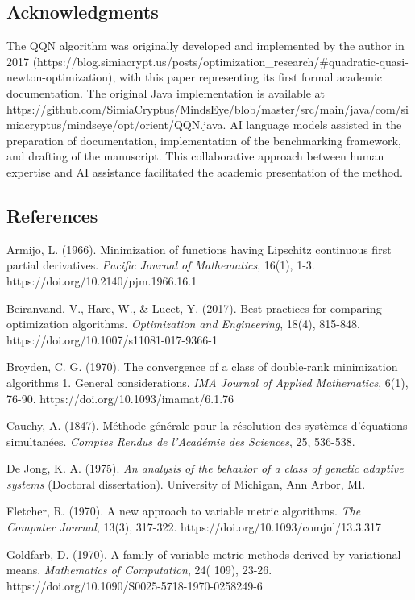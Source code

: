 \hypertarget{acknowledgments}{%
\subsection{Acknowledgments}\label{acknowledgments}}

The QQN algorithm was originally developed and implemented by the author in 2017 (https://blog.simiacrypt.us/posts/optimization\_research/\#quadratic-quasi-newton-optimization), with this paper representing its first formal academic documentation.
The original Java implementation is available at https://github.com/SimiaCryptus/MindsEye/blob/master/src/main/java/com/simiacryptus/mindseye/opt/orient/QQN.java.
AI language models assisted in the preparation of documentation, implementation of the benchmarking framework, and drafting of the manuscript. This collaborative approach between human expertise and AI assistance facilitated the academic presentation of the method.

\hypertarget{references}{%
\subsection{References}\label{references}}

Armijo, L. (1966). Minimization of functions having Lipschitz continuous first partial derivatives. \emph{Pacific Journal of
Mathematics}, 16(1), 1-3. https://doi.org/10.2140/pjm.1966.16.1

Beiranvand, V., Hare, W., \& Lucet, Y. (2017). Best practices for comparing optimization algorithms. \emph{Optimization and
Engineering}, 18(4), 815-848. https://doi.org/10.1007/s11081-017-9366-1

Broyden, C. G. (1970). The convergence of a class of double-rank minimization algorithms 1. General considerations. \emph{IMA
Journal of Applied Mathematics}, 6(1), 76-90. https://doi.org/10.1093/imamat/6.1.76

Cauchy, A. (1847). Méthode générale pour la résolution des systèmes d'équations simultanées. \emph{Comptes Rendus de
l'Académie des Sciences}, 25, 536-538.

De Jong, K. A. (1975). \emph{An analysis of the behavior of a class of genetic adaptive systems} (Doctoral dissertation).
University of Michigan, Ann Arbor, MI.

Fletcher, R. (1970). A new approach to variable metric algorithms. \emph{The Computer Journal}, 13(3),
317-322. https://doi.org/10.1093/comjnl/13.3.317

Goldfarb, D. (1970). A family of variable-metric methods derived by variational means. \emph{Mathematics of Computation}, 24(
109), 23-26. https://doi.org/10.1090/S0025-5718-1970-0258249-6

